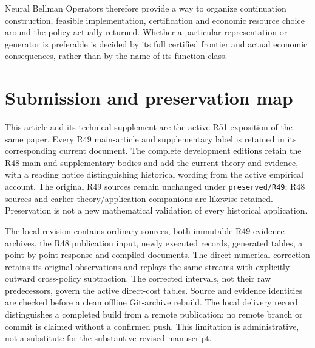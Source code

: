 \documentclass[ecta,nameyear,draft]{econsocart}
\begin{document}
Neural Bellman Operators therefore provide a way to organize continuation construction, feasible implementation, certification and economic resource choice around the policy actually returned. Whether a particular representation or generator is preferable is decided by its full certified frontier and actual economic consequences, rather than by the name of its function class.

\appendix
\section{Submission and preservation map}\label{sec:map49}
This article and its technical supplement are the active R51 exposition of the same paper. Every R49 main-article and supplementary label is retained in its corresponding current document. The complete development editions retain the R48 main and supplementary bodies and add the current theory and evidence, with a reading notice distinguishing historical wording from the active empirical account. The original R49 sources remain unchanged under \texttt{preserved/R49}; R48 sources and earlier theory/application companions are likewise retained. Preservation is not a new mathematical validation of every historical application.

The local revision contains ordinary sources, both immutable R49 evidence archives, the R48 publication input, newly executed records, generated tables, a point-by-point response and compiled documents. The direct numerical correction retains its original observations and replays the same streams with explicitly outward cross-policy subtraction. The corrected intervals, not their raw predecessors, govern the active direct-cost tables. Source and evidence identities are checked before a clean offline Git-archive rebuild. The local delivery record distinguishes a completed build from a remote publication: no remote branch or commit is claimed without a confirmed push. This limitation is administrative, not a substitute for the substantive revised manuscript.



\end{document}
